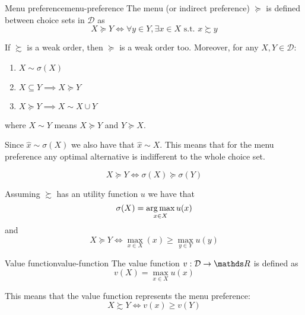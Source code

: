 \documentclass[12pt]{extarticle}
\begin{document}
\begin{definition}{Menu preference}{menu-preference}
	The menu (or indirect preference) $\succeq$ is defined between choice sets in $\mathcal D$ as
	\begin{equation}
		X \succeq Y \iff \forall y \in Y, \exists x \in X \text{ s.t. } x \succsim y
	\end{equation}
\end{definition}

\begin{proposition}{}{}
	If $\succsim$ is a weak order, then $\succeq$ is a weak order too.
	Moreover, for any $X, Y \in \mathcal D$:
	\begin{enumerate}[label=\roman*.]
		\item $X \sim \sigma (X)$
		\item $X \subseteq Y \implies X \succeq Y$
		\item $X \succeq Y \implies X \sim X \cup Y$
	\end{enumerate}
	where $X \sim Y$ means $X \succeq Y$ and $Y \succeq X$.
\end{proposition}

Since $\hat x \sim \sigma(X)$ we also have that $\hat x \sim X$.
This means that for the menu preference any optimal alternative is indifferent to the whole choice set.

\begin{corollary}{}{}
	\begin{equation}
		X \succeq Y \iff \sigma(X) \succeq \sigma(Y)
	\end{equation}
\end{corollary}

Assuming $\succsim$ has an utility function $u$ we have that
\begin{equation}
	\sigma(X) = \operatorname*{arg\,max}_{x \in X} u(x)
\end{equation}
and
\begin{equation}
	X \succeq Y \iff \max_{x \in X} (x) \geq \max_{y \in Y} u(y)
\end{equation}

\begin{definition}{Value function}{value-function}
	The value function $v: \mathcal D \to \R$ is defined as
	\begin{equation}
		v(X) = \max_{x \in X} u(x)
	\end{equation}
\end{definition}

This means that the value function represents the menu preference:
\begin{equation}
	X \succsim Y \iff v(x) \geq v(Y)
\end{equation}
\end{document}
